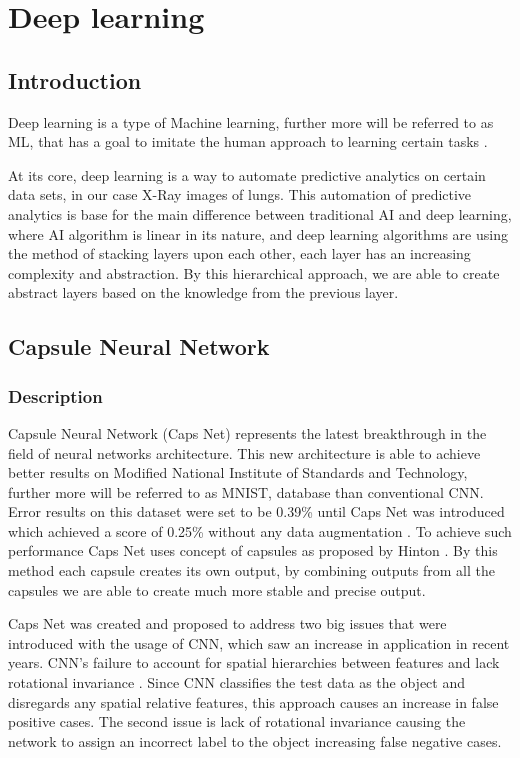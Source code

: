 \chapter{Deep learning} 
\section{Introduction}
    Deep learning is a type of Machine learning, further more will be referred to as ML, that has a goal to imitate the human approach to learning
    certain tasks \cite{Deep learning}. 

    At its core, deep learning is a way to automate predictive analytics on certain data sets, in our case X-Ray images of lungs.
    This automation of predictive analytics is base for the main difference between traditional AI and deep learning, where AI algorithm 
    is linear in its nature, and deep learning algorithms are using the method of stacking layers upon each other, each layer has an increasing 
    complexity and abstraction. By this hierarchical approach, we are able to create abstract layers based on the knowledge from the previous layer. 

\section{Capsule Neural Network}
    \subsection{Description}
        Capsule Neural Network (Caps Net) represents the latest breakthrough in the field of neural networks architecture. 
        This new architecture is able to achieve better results on Modified National Institute of Standards and Technology,  further more will be referred to as MNIST, database than conventional CNN. 
        Error results on this dataset were set to be 0.39\% 
        until Caps Net was introduced which achieved a score of 0.25\% without any data augmentation \cite{Capsule Neural Network performance on complex data}. 
        To achieve such performance Caps Net uses  concept of capsules as proposed by Hinton \cite{Dynamic routing between capsules}. By this method each
        capsule creates its own output, by combining outputs from all the capsules we are able to create much more stable and precise output.

        Caps Net was created and proposed to address two big issues that were introduced with the usage of CNN, which saw an increase in application in recent years. 
        CNN's failure to account for spatial hierarchies between features and lack rotational invariance \cite{Dynamic routing between capsules}. 
        Since CNN classifies the test data as the object and disregards any spatial relative features, this approach causes an increase in false positive cases. 
        The second issue is lack of rotational invariance causing the network to assign an incorrect label to the object increasing false negative cases. 


